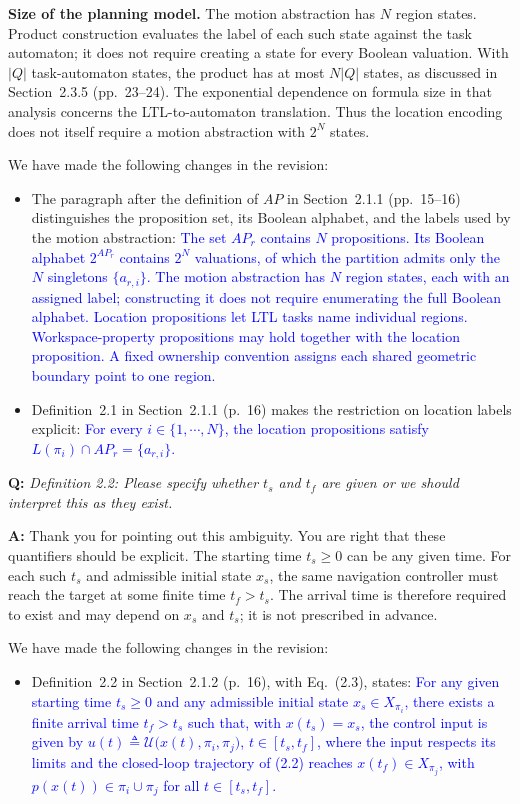 \documentclass[11pt]{article}
\newcommand{\change}[1]{\textcolor{blue}{#1}}
\begin{document}
\textbf{Size of the planning model.} The motion abstraction has $N$ region
states. Product construction evaluates the label of each such state against
the task automaton; it does not require creating a state for every Boolean
valuation. With $|Q|$ task-automaton states, the product has at most $N|Q|$
states, as discussed in Section~2.3.5 (pp.~23--24).
The exponential dependence on formula size in that analysis concerns the
LTL-to-automaton translation. Thus the location encoding does not itself
require a motion abstraction with $2^N$ states.

We have made the following changes in the revision:
\begin{itemize}
\item The paragraph after the definition of $AP$ in Section~2.1.1 (pp.~15--16)
distinguishes the proposition set, its Boolean alphabet, and the labels used by
the motion abstraction:
\change{The set $AP_r$ contains $N$ propositions. Its Boolean alphabet $2^{AP_r}$
contains $2^N$ valuations, of which the partition admits only the $N$
singletons $\{a_{r,i}\}$. The motion abstraction has $N$ region states,
each with an assigned label; constructing it does not require enumerating
the full Boolean alphabet. Location propositions let LTL tasks name
individual regions. Workspace-property propositions may hold together
with the location proposition. A fixed ownership convention assigns each
shared geometric boundary point to one region.}

\item Definition~2.1 in Section~2.1.1 (p.~16) makes the restriction on location
labels explicit:
\change{For every $i\in\{1,\cdots,N\}$, the location
propositions satisfy $L(\pi_i)\cap AP_r=\{a_{r,i}\}$.}
\end{itemize}

\begin{shaded*}
\noindent\textbf{Q:} \emph{Definition 2.2: Please specify whether $t_s$ and
$t_f$ are given or we should interpret this as they exist.}
\end{shaded*}
\noindent\textbf{A:} Thank you for pointing out this ambiguity. You are right that
these quantifiers should be explicit. The starting time $t_s\geq 0$ can be any
given time. For each such $t_s$ and admissible initial state $x_s$, the same
navigation controller must reach the target at some finite time $t_f>t_s$.
The arrival time is therefore required to exist and may depend on $x_s$ and
$t_s$; it is not prescribed in advance.

We have made the following changes in the revision:
\begin{itemize}
\item Definition~2.2 in Section~2.1.2 (p.~16), with Eq.~(2.3), states:
\change{For any given starting time $t_s\geq 0$ and
any admissible initial state $x_s\in X_{\pi_i}$, there exists a finite
arrival time $t_f>t_s$ such that, with $x(t_s)=x_s$, the control input is
given by
$u(t)\triangleq\mathcal{U}\bigl(x(t),\pi_i,\pi_j\bigr)$, $t\in[t_s,t_f]$,
where the input respects its limits and the closed-loop trajectory of
(2.2) reaches $x(t_f)\in X_{\pi_j}$, with $p(x(t))\in\pi_i\cup\pi_j$ for all
$t\in[t_s,t_f]$.}
\end{itemize}
\end{document}
